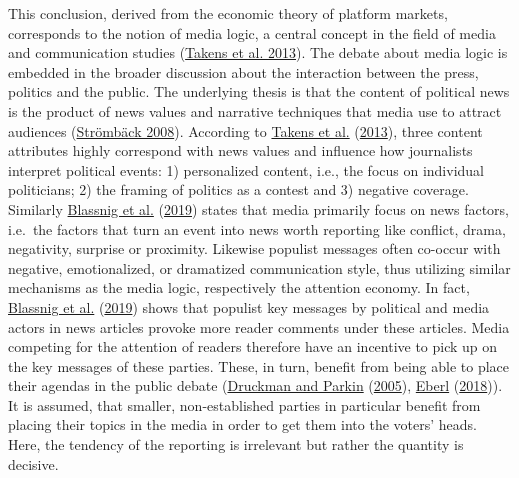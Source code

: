 \documentclass[
]{article}
\begin{document}
This conclusion, derived from the economic theory of platform markets,
corresponds to the notion of media logic, a central concept in the field
of media and communication studies
(\protect\hyperlink{ref-takens_media_2013}{Takens et al. 2013}). The
debate about media logic is embedded in the broader discussion about the
interaction between the press, politics and the public. The underlying
thesis is that the content of political news is the product of news
values and narrative techniques that media use to attract audiences
(\protect\hyperlink{ref-stromback_four_2008}{Strömbäck 2008}). According
to \protect\hyperlink{ref-takens_media_2013}{Takens et al.}
(\protect\hyperlink{ref-takens_media_2013}{2013}), three content
attributes highly correspond with news values and influence how
journalists interpret political events: 1) personalized content, i.e.,
the focus on individual politicians; 2) the framing of politics as a
contest and 3) negative coverage. Similarly
\protect\hyperlink{ref-blassnig_hitting_2019}{Blassnig et al.}
(\protect\hyperlink{ref-blassnig_hitting_2019}{2019}) states that media
primarily focus on news factors, i.e.~the factors that turn an event
into news worth reporting like conflict, drama, negativity, surprise or
proximity. Likewise populist messages often co-occur with negative,
emotionalized, or dramatized communication style, thus utilizing similar
mechanisms as the media logic, respectively the attention economy. In
fact, \protect\hyperlink{ref-blassnig_hitting_2019}{Blassnig et al.}
(\protect\hyperlink{ref-blassnig_hitting_2019}{2019}) shows that
populist key messages by political and media actors in news articles
provoke more reader comments under these articles. Media competing for
the attention of readers therefore have an incentive to pick up on the
key messages of these parties. These, in turn, benefit from being able
to place their agendas in the public debate
(\protect\hyperlink{ref-druckman_impact_2005}{Druckman and Parkin}
(\protect\hyperlink{ref-druckman_impact_2005}{2005}),
\protect\hyperlink{ref-eberl_lying_2018}{Eberl}
(\protect\hyperlink{ref-eberl_lying_2018}{2018})). It is assumed, that
smaller, non-established parties in particular benefit from placing
their topics in the media in order to get them into the voters' heads.
Here, the tendency of the reporting is irrelevant but rather the
quantity is decisive.
\end{document}
